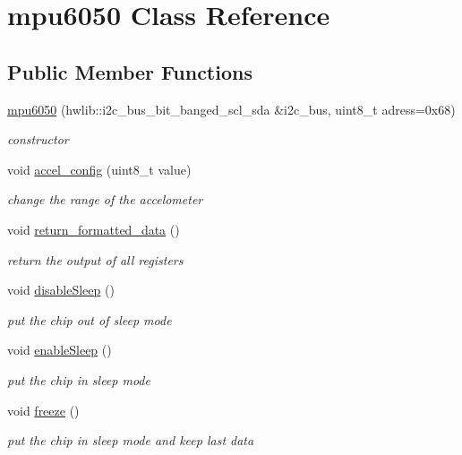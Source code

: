 \hypertarget{classmpu6050}{}\section{mpu6050 Class Reference}
\label{classmpu6050}
\subsection*{Public Member Functions}
\begin{DoxyCompactItemize}
\item 
\hyperlink{classmpu6050_a1938b793c68db02885ef121b0718db54}{mpu6050} (hwlib\+::i2c\+\_\+bus\+\_\+bit\+\_\+banged\+\_\+scl\+\_\+sda \&i2c\+\_\+bus, uint8\+\_\+t adress=0x68)
\begin{DoxyCompactList}\small\item\em constructor \end{DoxyCompactList}\item 
void \hyperlink{classmpu6050_a4beff110fd439cee20fe7bbf1d18b5cf}{accel\+\_\+config} (uint8\+\_\+t value)
\begin{DoxyCompactList}\small\item\em change the range of the accelometer \end{DoxyCompactList}\item 
void \hyperlink{classmpu6050_aef4c4ff834f62b2a57342fa6c761f701}{return\+\_\+formatted\+\_\+data} ()
\begin{DoxyCompactList}\small\item\em return the output of all registers \end{DoxyCompactList}\item 
void \hyperlink{classmpu6050_af945ffe99c421c67cd4e4134a37f99d2}{disable\+Sleep} ()
\begin{DoxyCompactList}\small\item\em put the chip out of sleep mode \end{DoxyCompactList}\item 
void \hyperlink{classmpu6050_a766d1a6a4d9af1dc47a21ae91b1ee289}{enable\+Sleep} ()
\begin{DoxyCompactList}\small\item\em put the chip in sleep mode \end{DoxyCompactList}\item 
void \hyperlink{classmpu6050_ad4a85ae4b16557eed6d4d690840f8358}{freeze} ()
\begin{DoxyCompactList}\small\item\em put the chip in sleep mode and keep last data \end{DoxyCompactList}\item 

\end{DoxyCompactItemize}
